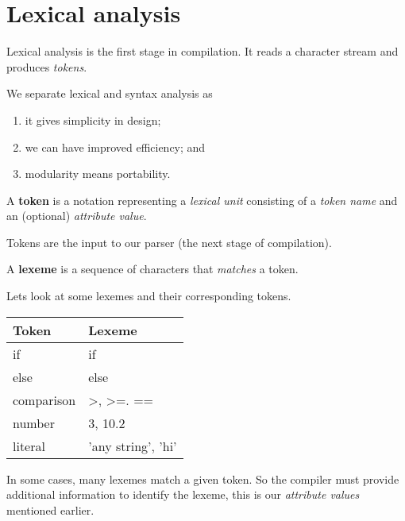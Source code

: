 \chapter{Lexical analysis}

Lexical analysis is the first stage in compilation.
It reads a character stream and produces \emph{tokens}.

We separate lexical and syntax analysis as
\begin{enumerate}
    \item it gives simplicity in design;
    \item we can have improved efficiency; and
    \item modularity means portability.
\end{enumerate}

\begin{definition}[Token]
    A \textbf{token} is a notation representing a \emph{lexical unit}
    consisting of a \emph{token name} and an (optional) \emph{attribute value}.
\end{definition}

Tokens are the input to our parser (the next stage of compilation).

\begin{definition}[Lexeme]
    A \textbf{lexeme} is a sequence of characters that \emph{matches} a token.
\end{definition}

\begin{example}
    Lets look at some lexemes and their corresponding tokens.
    \begin{center}
        \ttfamily
        \begin{tabular}{ll}
            \toprule
            \normalfont Token & \normalfont Lexeme \\ 
            \midrule
            if & if \\
            else & else \\
            comparison & >, >=. == \\
            number & 3, 10.2 \\
            literal & 'any string', 'hi' \\
            \bottomrule
        \end{tabular}
    \end{center}
\end{example}

In some cases, many lexemes match a given token.
So the compiler must provide additional information to identify the lexeme,
this is our \emph{attribute values} mentioned earlier.

